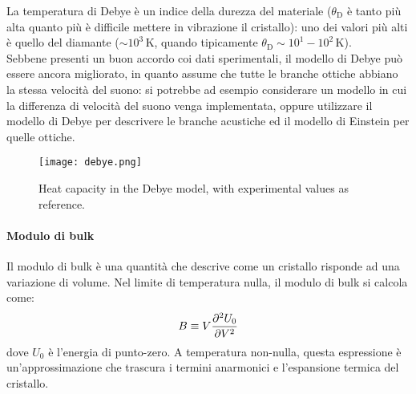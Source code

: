 La temperatura di Debye è un indice della durezza del materiale ($ \theta_\text{D} $ è tanto più alta quanto più è difficile mettere in vibrazione il cristallo): uno dei valori più alti è quello del diamante ($ \sim 10^3 \,\text{K} $, quando tipicamente $ \theta_\text{D} \sim 10^1 - 10^2 \,\text{K} $). \\
Sebbene presenti un buon accordo coi dati sperimentali, il modello di Debye può essere ancora migliorato, in quanto assume che tutte le branche ottiche abbiano la stessa velocità del suono: si potrebbe ad esempio considerare un modello in cui la differenza di velocità del suono venga implementata, oppure utilizzare il modello di Debye per descrivere le branche acustiche ed il modello di Einstein per quelle ottiche.


\begin{figure}
	\centering
	\texttt{[image: debye.png]}
	\caption{Heat capacity in the Debye model, with experimental values as reference.}
	\label{deb}
\end{figure}

\paragraph{Modulo di bulk}

Il modulo di bulk è una quantità che descrive come un cristallo risponde ad una variazione di volume. Nel limite di temperatura nulla, il modulo di bulk si calcola come:
\begin{equation}
	B \equiv V \frac{\partial^2 U_0}{\partial V^2}
\end{equation}
dove $ U_0 $ è l'energia di punto-zero. A temperatura non-nulla, questa espressione è un'approssimazione che trascura i termini anarmonici e l'espansione termica del cristallo.


